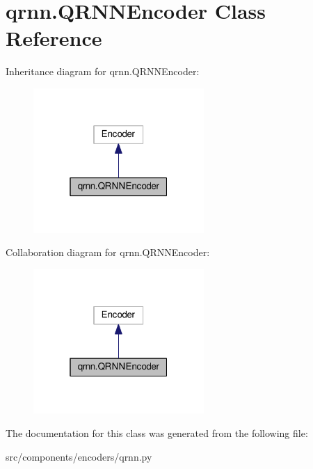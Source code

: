 \hypertarget{classqrnn_1_1QRNNEncoder}{}\section{qrnn.\+Q\+R\+N\+N\+Encoder Class Reference}
\label{classqrnn_1_1QRNNEncoder}


Inheritance diagram for qrnn.\+Q\+R\+N\+N\+Encoder\+:
\nopagebreak
\begin{figure}[H]
\begin{center}
\leavevmode
\includegraphics[width=184pt]{classqrnn_1_1QRNNEncoder__inherit__graph}
\end{center}
\end{figure}


Collaboration diagram for qrnn.\+Q\+R\+N\+N\+Encoder\+:
\nopagebreak
\begin{figure}[H]
\begin{center}
\leavevmode
\includegraphics[width=184pt]{classqrnn_1_1QRNNEncoder__coll__graph}
\end{center}
\end{figure}


The documentation for this class was generated from the following file\+:\begin{DoxyCompactItemize}
\item 
src/components/encoders/qrnn.\+py\end{DoxyCompactItemize}
